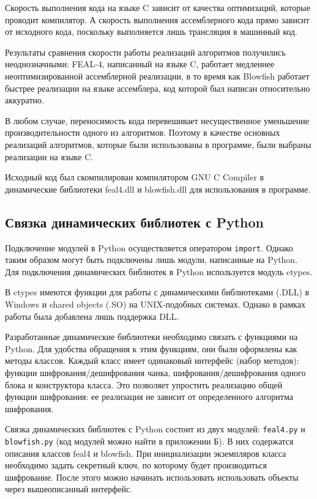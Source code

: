 Скорость выполнения кода на языке C зависит от качества оптимизаций,
которые проводит компилятор. А скорость выполнения ассемблерного кода
прямо зависит от исходного кода, поскольку выполняется лишь трансляция
в машинный код.

Результаты сравнения скорости работы реализаций алгоритмов получились
неоднозначными: FEAL-4, написанный на языке C, работает медленнее
неоптимизированной ассемблерной реализации, в то время как Blowfish работает
быстрее реализации на языке ассемблера, код которой был написан
относительно аккуратно.

В любом случае, переносимость кода перевешивает несущественное
уменьшение производительности одного из алгоритмов. Поэтому в качестве
основных реализаций алгоритмов, которые были использованы в программе,
были выбраны реализации на языке C.

Исходный код был скомпилирован компилятором GNU C Compiler в динамические
библиотеки feal4.dll и blowfish.dll для использования в программе.

\newpage
\subsection{Связка динамических библиотек с Python}\label{ssec:python-algo-bindings} %

Подключение модулей в Python осуществляется оператором \texttt{import}.
Однако таким образом могут быть подключены лишь модули, написанные
на Python. Для подключения динамических библиотек в Python
используется модуль ctypes.

В ctypes имеются функции для работы с динамическими библиотеками (.DLL)
в Windows и shared objects (.SO) на UNIX-подобных системах.
Однако в рамках работы была добавлена лишь поддержка DLL.

Разработанные динамические библиотеки необходимо связать с функциями
на Python. Для удобства обращения к этим функциям, они были оформлены
как методы классов. Каждый класс имеет одинаковый интерфейс (набор методов):
функции шифрования/дешифрования чанка, шифрования/дешифрования
одного блока и конструктора класса. Это позволяет упростить реализацию
общей функции шифрования: ее реализация не зависит от определенного
алгоритма шифрования.

Связка динамических библиотек с Python состоит из двух модулей:
\texttt{feal4.py} и \texttt{blowfish.py} (код модулей можно найти в приложении Б).
В них содержатся описания классов feal4 и blowfish. При инициализации
экземпляров класса необходимо задать секретный ключ, по которому будет
производиться шифрование. После этого можно начинать использовать использовать
объекты через вышеописанный интерфейс.


